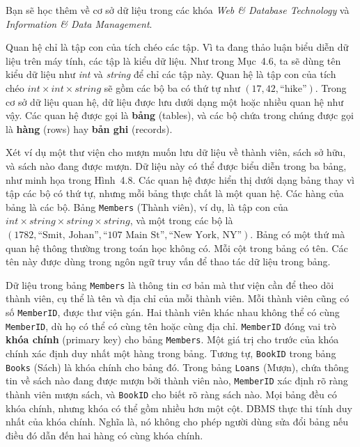 \begin{infobox}
Bạn sẽ học thêm về cơ sở dữ liệu trong các khóa \emph{Web \& Database Technology} và \emph{Information \& Data Management}.
\end{infobox}

Quan hệ chỉ là tập con của tích chéo các tập. Vì ta đang thảo luận biểu diễn dữ liệu trên máy tính, các tập là kiểu dữ liệu. Như trong Mục~4.6, ta sẽ dùng tên kiểu dữ liệu như \textit{int} và \textit{string} để chỉ các tập này. Quan hệ là tập con của tích chéo $\mathit{int} \times \mathit{int} \times \mathit{string}$ sẽ gồm các bộ ba có thứ tự như $(17, 42, \text{``hike''})$. Trong cơ sở dữ liệu quan hệ, dữ liệu được lưu dưới dạng một hoặc nhiều quan hệ như vậy. Các quan hệ được gọi là \textbf{bảng} (tables), và các bộ chứa trong chúng được gọi là \textbf{hàng} (rows) hay \textbf{bản ghi} (records).

Xét ví dụ một thư viện cho mượn muốn lưu dữ liệu về thành viên, sách sở hữu, và sách nào đang được mượn. Dữ liệu này có thể được biểu diễn trong ba bảng, như minh họa trong Hình~4.8. Các quan hệ được hiển thị dưới dạng bảng thay vì tập các bộ có thứ tự, nhưng mỗi bảng thực chất là một quan hệ. Các hàng của bảng là các bộ. Bảng \texttt{Members} (Thành viên), ví dụ, là tập con của $\mathit{int} \times \mathit{string} \times \mathit{string} \times \mathit{string}$, và một trong các bộ là $(1782, \text{``Smit, Johan''}, \text{``107 Main St''}, \text{``New York, NY''})$. Bảng có một thứ mà quan hệ thông thường trong toán học không có. Mỗi cột trong bảng có tên. Các tên này được dùng trong ngôn ngữ truy vấn để thao tác dữ liệu trong bảng.

Dữ liệu trong bảng \texttt{Members} là thông tin cơ bản mà thư viện cần để theo dõi thành viên, cụ thể là tên và địa chỉ của mỗi thành viên. Mỗi thành viên cũng có số \texttt{MemberID}, được thư viện gán. Hai thành viên khác nhau không thể có cùng \texttt{MemberID}, dù họ có thể có cùng tên hoặc cùng địa chỉ. \texttt{MemberID} đóng vai trò \textbf{khóa chính} (primary key) cho bảng \texttt{Members}. Một giá trị cho trước của khóa chính xác định duy nhất một hàng trong bảng. Tương tự, \texttt{BookID} trong bảng \texttt{Books} (Sách) là khóa chính cho bảng đó. Trong bảng \texttt{Loans} (Mượn), chứa thông tin về sách nào đang được mượn bởi thành viên nào, \texttt{MemberID} xác định rõ ràng thành viên mượn sách, và \texttt{BookID} cho biết rõ ràng sách nào. Mọi bảng đều có khóa chính, nhưng khóa có thể gồm nhiều hơn một cột. DBMS thực thi tính duy nhất của khóa chính. Nghĩa là, nó không cho phép người dùng sửa đổi bảng nếu điều đó dẫn đến hai hàng có cùng khóa chính.

